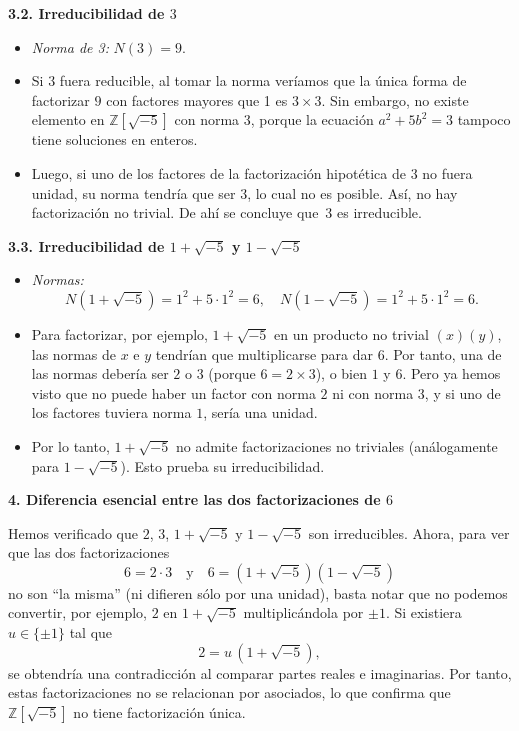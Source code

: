 \medskip

\noindent
\textbf{3.2. Irreducibilidad de \(3\)}

\begin{itemize}
    \item \emph{Norma de 3:} \(N(3) = 9\).
    \item Si \(3\) fuera reducible, al tomar la norma veríamos que la única forma de factorizar \(9\) con factores mayores que 1 es \(3 \times 3\). Sin embargo, no existe elemento en \(\mathbb{Z}[\sqrt{-5}]\) con norma \(3\), porque la ecuación \(a^2 + 5b^2 = 3\) tampoco tiene soluciones en enteros.
    \item Luego, si uno de los factores de la factorización hipotética de \(3\) no fuera unidad, su norma tendría que ser \(3\), lo cual no es posible. Así, no hay factorización no trivial. De ahí se concluye que \(\,3\) es irreducible.
\end{itemize}

\medskip

\noindent
\textbf{3.3. Irreducibilidad de \(1 + \sqrt{-5}\) y \(1 - \sqrt{-5}\)}

\begin{itemize}
    \item \emph{Normas:} 
    \[
    N(1 + \sqrt{-5}) = 1^2 + 5\cdot1^2 = 6,
    \quad
    N(1 - \sqrt{-5}) = 1^2 + 5\cdot1^2 = 6.
    \]
    \item Para factorizar, por ejemplo, \(1 + \sqrt{-5}\) en un producto no trivial \((x)(y)\), las normas de \(x\) e \(y\) tendrían que multiplicarse para dar \(6\). Por tanto, una de las normas debería ser \(2\) o \(3\) (porque \(6 = 2 \times 3\)), o bien \(1\) y \(6\). Pero ya hemos visto que no puede haber un factor con norma \(2\) ni con norma \(3\), y si uno de los factores tuviera norma \(1\), sería una unidad.  
    \item Por lo tanto, \(1 + \sqrt{-5}\) no admite factorizaciones no triviales (análogamente para \(1 - \sqrt{-5}\)). Esto prueba su irreducibilidad.
\end{itemize}

\bigskip

\noindent
\textbf{4. Diferencia esencial entre las dos factorizaciones de \(6\)}

\noindent
Hemos verificado que \(2\), \(3\), \(1 + \sqrt{-5}\) y \(1 - \sqrt{-5}\) son irreducibles. Ahora, para ver que las dos factorizaciones
\[
6 = 2 \cdot 3
\quad\text{y}\quad
6 = (1 + \sqrt{-5})(1 - \sqrt{-5})
\]
no son “la misma” (ni difieren sólo por una unidad), basta notar que no podemos convertir, por ejemplo, \(2\) en \(1 + \sqrt{-5}\) multiplicándola por \(\pm1\). Si existiera \(u \in \{\pm 1\}\) tal que 
\[
2 = u\, (1 + \sqrt{-5}),
\]
se obtendría una contradicción al comparar partes reales e imaginarias.  
Por tanto, estas factorizaciones no se relacionan por asociados, lo que confirma que \(\mathbb{Z}[\sqrt{-5}]\) no tiene factorización única.

